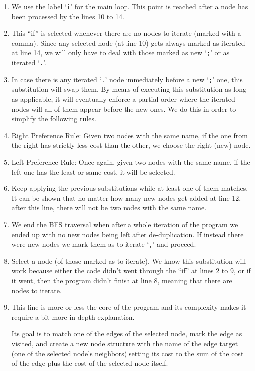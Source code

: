 \begin{enumerate}
	\item We use the label `\verb|i|' for the main loop.  This point is
		reached after a node has been processed by the lines 10 to 14.
	\item This ``if'' is selected whenever there are no nodes to iterate
		(marked with a comma).  Since any selected node (at line 10) gets
		always marked as iterated at line 14, we will only have to deal
		with those marked as new `\verb|;|' or as iterated `\verb|.|'.
	\addtocounter{enumi}{1}
	\item In case there is any iterated `\verb|.|' node immediately before
		a new `\verb|;|' one, this substitution will swap them.  By means
		of executing this substitution as long as applicable, it will
		eventually enforce a partial order where the iterated nodes will all
		of them appear before the new ones.
		We do this in order to simplify the following rules.
	\item Right Preference Rule: Given two nodes with the same name, if
		the one from the right has strictly less cost than the other, we
		choose the right (new) node.
	\item Left Preference Rule: Once again, given two nodes with the same name,
		if the left one has the least or same cost, it will be selected.
	\item Keep applying the previous substitutions while at least one of
		them matches.  It can be shown that no matter how
		many new nodes get added at line 12, after this line, there will
		not be two nodes with the same name.
	\item We end the BFS traversal when after a whole iteration of the
		program we ended up with no new nodes being left after de-duplication.
		If instead there were new nodes we mark them as to iterate `\verb|,|'
		and proceed.
	\addtocounter{enumi}{1}
	\item Select a node (of those marked as to iterate).  We know this
		substitution will work because either the code didn't went through
		the ``if'' at lines 2 to 9, or if it went, then the program didn't
		finish at line 8, meaning that there are nodes to iterate.
	\addtocounter{enumi}{1}
	\item This line is more or less the core of the program and its complexity
		makes it require a bit more in-depth explanation.

		Its goal is to match one of the edges of the selected node, mark the
		edge as visited, and create a new node structure with the name of the
		edge target (one of the selected node's neighbors) setting its cost
		to the sum of the cost of the edge plus the cost of the selected
		node itself.


\end{enumerate}
